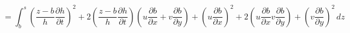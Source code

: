 \documentclass[12pt]{article}
\begin{document}
\[ = \int_b^s  \left(\frac{z - b}{h} \frac{\partial h}{\partial t}\right)^2 + 2\left(\frac{z - b}{h} \frac{\partial h}{\partial t}\right)\left(u \frac{\partial b}{\partial x} + v \frac{\partial b}{\partial y}\right) + \left( u \frac{\partial b}{\partial x}\right)^2 + 2\left(u \frac{\partial b}{\partial x} v \frac{\partial b}{\partial y}\right) + \left(v \frac{\partial b}{\partial y}\right)^2 \, dz  \]


\end{document}
